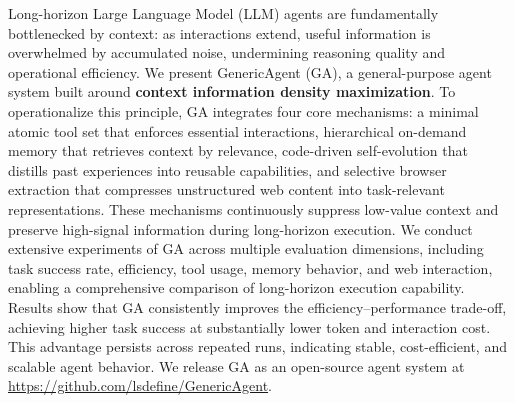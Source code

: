 Long-horizon Large Language Model (LLM) agents are fundamentally bottlenecked by context: as interactions extend, useful information is overwhelmed by accumulated noise, undermining reasoning quality and operational efficiency. 
We present GenericAgent (GA), a general-purpose agent system built around \textbf{context information density maximization}.
To operationalize this principle, GA integrates four core mechanisms: a minimal atomic tool set that enforces essential interactions, hierarchical on-demand memory that retrieves context by relevance, code-driven self-evolution that distills past experiences into reusable capabilities, and selective browser extraction that compresses unstructured web content into task-relevant representations.
These mechanisms continuously suppress low-value context and preserve high-signal information during long-horizon execution. 
We conduct extensive experiments of GA across multiple evaluation dimensions, including task success rate, efficiency, tool usage, memory behavior, and web interaction, enabling a comprehensive comparison of long-horizon execution capability.
Results show that GA consistently improves the efficiency–performance trade-off, achieving higher task success at substantially lower token and interaction cost. This advantage persists across repeated runs, indicating stable, cost-efficient, and scalable agent behavior. 
We release GA as an open-source agent system at \href{https://github.com/lsdefine/GenericAgent/}{https://github.com/lsdefine/GenericAgent}.




